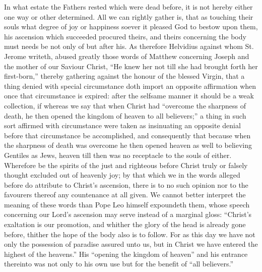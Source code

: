In what estate the Fathers rested which were dead before, it is not hereby either one way or other determined. All we can rightly gather is, that as touching their souls what degree of joy or happiness soever it pleased God to bestow upon them, his ascension which succeeded procured theirs, and theirs concerning the body must needs be not only of but after his. As therefore Helvidius against whom St. Jerome writeth, abused greatly those words of Matthew concerning Joseph and the mother of our Saviour Christ, “He knew her not till she had brought forth her first-born,” thereby gathering against the honour of the blessed Virgin, that a thing denied with special circumstance doth import an opposite affirmation when once that circumstance is expired: after the selfsame manner it should be a weak collection, if whereas we say that when Christ had “overcome the sharpness of death, he then opened the kingdom of heaven to all believers;” a thing in such sort affirmed with circumstance were taken as insinuating an opposite denial before that circumstance be accomplished, and consequently that because when the sharpness of death was overcome he then opened heaven as well to believing Gentiles as Jews, heaven till then was no receptacle to the souls of either. Wherefore be the spirits of the just and righteous before Christ truly or falsely thought excluded out of heavenly joy; by that which we in the words alleged before do attribute to Christ’s ascension, there is to no such opinion nor to the favourers thereof any  countenance at all given. We cannot better interpret the meaning of these words than Pope Leo himself expoundeth them, whose speech concerning our Lord’s ascension may serve instead of a marginal gloss: “Christ’s exaltation is our promotion, and whither the glory of the head is already gone before, thither the hope of the body also is to follow. For as this day we have not only the possession of paradise assured unto us, but in Christ we have entered the highest of the heavens.” His “opening the kingdom of heaven” and his entrance thereinto was not only to his own use but for the benefit of “all believers.”

